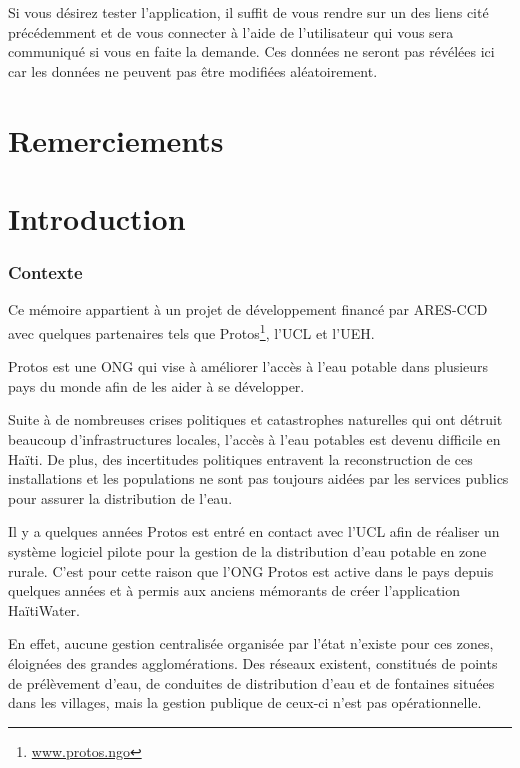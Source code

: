 \documentclass{EPL-master-thesis-covers-FR}
\begin{document}
		Si vous désirez tester l'application, il suffit de vous rendre sur un des liens cité précédemment et de vous connecter à l'aide de l'utilisateur qui vous sera communiqué si vous en faite la demande. Ces données ne seront pas révélées ici car les données ne peuvent pas être modifiées aléatoirement. 
		

	\chapter*{Remerciements}

		


	\chapter{Introduction}

		
		\subsection*{Contexte}
		
			Ce mémoire appartient à un projet de développement financé par ARES-CCD avec quelques partenaires tels que Protos\footnote{\href{https://www.protos.ngo/fr/}{www.protos.ngo}}, l'UCL et l'UEH. 
			
			Protos est une ONG qui vise à améliorer l'accès à l'eau potable dans plusieurs pays du monde afin de les aider à se développer. 
			
			Suite à de nombreuses crises politiques et catastrophes naturelles qui ont détruit beaucoup d'infrastructures locales, l'accès à l'eau potables est devenu difficile en Haïti. De plus, des incertitudes politiques entravent la reconstruction de ces installations et les populations ne sont pas toujours aidées par les services publics pour assurer la distribution de l'eau. 
			
			Il y a quelques années Protos est entré en contact avec l'UCL afin de réaliser un système logiciel pilote pour la gestion de la distribution d'eau potable en zone rurale. C'est pour cette raison que l'ONG Protos est active dans le pays depuis quelques années et à permis aux anciens mémorants de créer l'application HaïtiWater.
			
			 En effet, aucune gestion centralisée organisée par l'état n'existe pour ces zones, éloignées des grandes agglomérations. Des réseaux existent, constitués de points de prélèvement d'eau, de conduites de distribution d'eau et de fontaines situées dans les villages, mais la gestion publique de ceux-ci n'est pas opérationnelle. 
\end{document}
